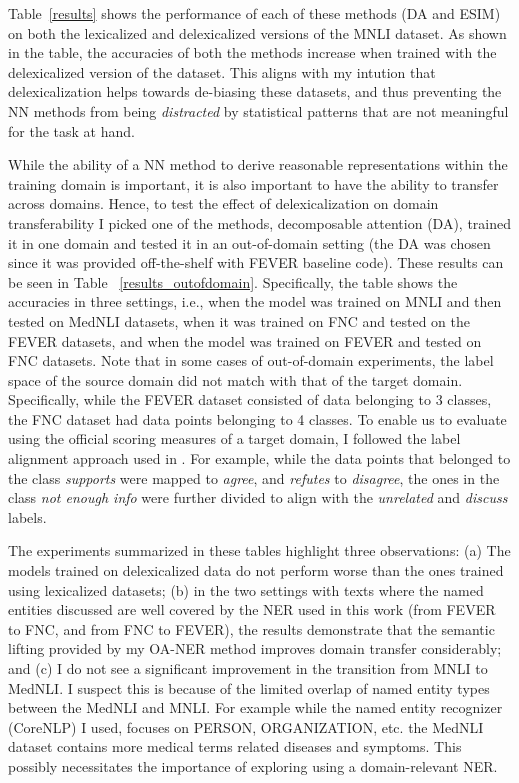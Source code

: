 \documentclass[compsoc,onecolumn]{IEEEtran}
\begin{document}
Table~\ref{results} shows the performance of each of these methods (DA and ESIM) on  both the lexicalized and delexicalized versions of the MNLI dataset. As shown in the table, the accuracies of both the methods increase when trained with the delexicalized version of the dataset. This aligns with my intution that delexicalization helps towards de-biasing these datasets, and thus preventing the NN methods from being \textit{distracted} by  statistical patterns that are not meaningful for the task at hand.
 
While the ability of a NN method to derive reasonable representations within the training domain is important, it is also important to have the ability to transfer across domains. Hence, to test the effect of delexicalization on domain transferability I picked one of the methods, decomposable attention (DA), trained it in one domain and tested it in an out-of-domain setting (the DA was chosen since it was provided off-the-shelf with FEVER baseline code). These results can be seen in Table ~\ref{results_outofdomain}. Specifically, the table shows the accuracies in three settings, i.e., when the model was trained on MNLI and then tested on MedNLI datasets, when it was trained on FNC and  tested on the FEVER datasets, and when the model was trained on FEVER and tested on FNC datasets. Note that in some cases of out-of-domain experiments, the label space of the source domain did not match with that of the target domain. Specifically, while the FEVER dataset consisted of data belonging to 3 classes, the FNC dataset had data points belonging to 4 classes. To enable us to evaluate using the official scoring measures of a target domain, I followed the label alignment approach used in \citep*{emnlp2019sandeep}. For example, while the data points that belonged to the class \textit{supports} were mapped to \textit{agree}, and \textit{refutes} to \textit{disagree}, the ones in the class \textit{not enough info} were further divided to align with the \textit{unrelated} and \textit{discuss} labels.

The experiments summarized in these tables highlight three observations: (a) The models trained on delexicalized data do not perform worse than the ones trained using lexicalized datasets; (b) in the two settings with texts where the named entities discussed are well covered by the NER used in this work (from FEVER to FNC, and from FNC to FEVER), the results demonstrate that the semantic lifting provided by my OA-NER method improves domain transfer considerably; and (c) I do not see a significant improvement in the transition from MNLI to MedNLI.  I suspect this is because of the limited overlap of named entity types between the MedNLI and MNLI. For example while the named entity recognizer (CoreNLP) I used, focuses on PERSON, ORGANIZATION, etc. the MedNLI dataset contains more medical terms related diseases and symptoms. This possibly necessitates the importance of exploring using a domain-relevant NER.
\end{document}
